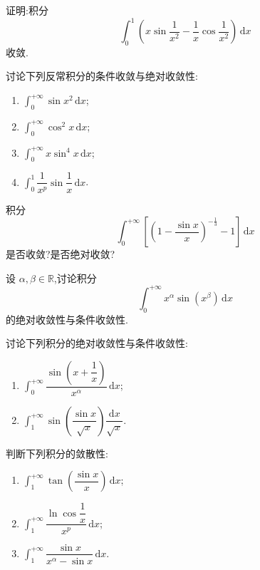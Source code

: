 \documentclass[../数学分析培优讲义.tex]{subfiles}
\begin{document}
\begin{example}
证明:积分
\[
    \int_0^1\left(x\sin\dfrac{1}{x^2}-\dfrac{1}{x}\cos\dfrac{1}{x^2}\right)\,\mathrm{d}x
\]
收敛.
\end{example}
\exampleblank

\begin{example}
讨论下列反常积分的条件收敛与绝对收敛性:
\begin{enumerate}[label=(\arabic*)]
    \item $\displaystyle\int_0^{+\infty}\sin x^2\,\mathrm{d}x$;
    \item $\displaystyle\int_0^{+\infty}\cos^2x\,\mathrm{d}x$;
    \item $\displaystyle\int_0^{+\infty}x\sin^4x\,\mathrm{d}x$;
    \item $\displaystyle\int_0^1\dfrac{1}{x^p}\sin\dfrac{1}{x}\,\mathrm{d}x$.
\end{enumerate}
\end{example}
\exampleblank

\begin{example}
积分
\[
    \int_0^{+\infty}\left[\left(1-\dfrac{\sin x}{x}\right)^{-\frac{1}{3}}-1\right]\,\mathrm{d}x
\]
是否收敛?是否绝对收敛?
\end{example}
\exampleblank

\begin{example}
设 $\alpha,\beta\in\mathbb{R}$,讨论积分
\[
    \int_0^{+\infty}x^\alpha\sin(x^\beta)\,\mathrm{d}x
\]
的绝对收敛性与条件收敛性.
\end{example}
\exampleblank

\begin{example}
讨论下列积分的绝对收敛性与条件收敛性:
\begin{enumerate}[label=(\arabic*)]
    \item $\displaystyle\int_0^{+\infty}\dfrac{\sin\left(x+\dfrac{1}{x}\right)}{x^\alpha}\,\mathrm{d}x$;
    \item $\displaystyle\int_1^{+\infty}\sin\left(\dfrac{\sin x}{\sqrt{x}}\right)\dfrac{\mathrm{d}x}{\sqrt{x}}$.
\end{enumerate}
\end{example}
\exampleblank

\begin{example}
判断下列积分的敛散性:
\begin{enumerate}[label=(\arabic*)]
    \item $\displaystyle\int_1^{+\infty}\tan\left(\dfrac{\sin x}{x}\right)\,\mathrm{d}x$;
    \item $\displaystyle\int_1^{+\infty}\dfrac{\ln\cos\dfrac{1}{x}}{x^p}\,\mathrm{d}x$;
    \item $\displaystyle\int_1^{+\infty}\dfrac{\sin x}{x^\alpha-\sin x}\,\mathrm{d}x$.
\end{enumerate}
\end{example}
\exampleblank
\end{document}
